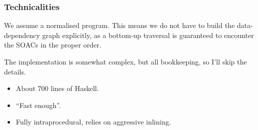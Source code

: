 \documentclass{beamer}
\begin{document}

\begin{frame}[fragile,t]
  \frametitle{Technicalities}

  We assume a normalised program.  This means we do not have to build
  the data-dependency graph explicitly, as a bottom-up traversal is
  guaranteed to encounter the SOACs in the proper order.

  The implementation is somewhat complex, but all bookkeeping, so I'll
  skip the details.

  \begin{itemize}
    \item About 700 lines of Haskell.
    \item ``Fast enough''.
    \item Fully intraprocedural, relies on aggressive inlining.
  \end{itemize}
\end{frame}
\end{document}
